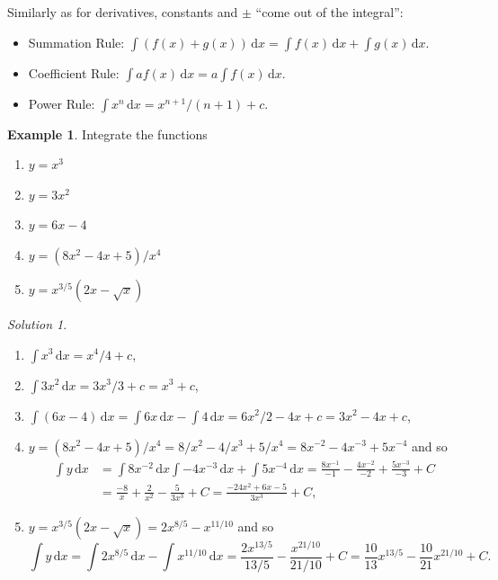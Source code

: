 \documentclass[
  english,
  11pt,
  oneside]{book}
\providecommand{\tightlist}{%
  \setlength{\itemsep}{0pt}\setlength{\parskip}{0pt}}
\newcommand{\slide}{}
\theoremstyle{definition}
\theoremstyle{definition}
\newtheorem{example}{Example}[chapter]
\theoremstyle{definition}
\theoremstyle{definition}
\theoremstyle{remark}
\newtheorem*{solution}{Solution}
\begin{document}
\slide

Similarly as for derivatives, constants and \(\pm\) ``come out of the integral'':

\begin{itemize}
\tightlist
\item
  Summation Rule: \(\displaystyle\int(f(x)+g(x))\,\mathrm{d}x = \displaystyle\int f(x)\,\mathrm{d}x + \displaystyle\int g(x)\,\mathrm{d}x\).
\item
  Coefficient Rule: \(\displaystyle\int af(x)\,\mathrm{d}x = a\displaystyle\int f(x)\,\mathrm{d}x\).
\item
  Power Rule: \(\displaystyle\int x^n \,\mathrm{d}x = x^{n+1}/(n+1) + c\).
\end{itemize}

\slide

\begin{example}

Integrate the functions

\begin{enumerate}
\def\labelenumi{\arabic{enumi}.}
\tightlist
\item
  \(y=x^3\)
\item
  \(y=3x^2\)
\item
  \(y=6x-4\)
\item
  \(y=(8x^2-4x+5)/x^4\)
\item
  \(y=x^{3/5}(2x-\sqrt{x})\)
\end{enumerate}

\end{example}

\begin{solution}
\leavevmode

\begin{enumerate}
\def\labelenumi{\arabic{enumi}.}
\tightlist
\item
  \(\displaystyle\int x^3 \,\mathrm{d}x = x^4/4+c\),
\item
  \(\displaystyle\int 3x^2 \,\mathrm{d}x = 3x^3/3+c = x^3+c\),
\item
  \(\displaystyle\int(6x-4)\,\mathrm{d}x = \displaystyle\int 6x \,\mathrm{d}x - \displaystyle\int 4\,\mathrm{d}x = 6x^2/2-4x+c = 3x^2-4x+c\),
\item
  \(y=(8x^2-4x+5)/x^4 = 8/x^2-4/x^3+5/x^4 = 8x^{-2}-4x^{-3}+5x^{-4}\) and so
  \begin{align*}
  \int y \,\mathrm{d}x& = \int 8x^{-2}\,\mathrm{d}x\int -4x^{-3}\,\mathrm{d}x+\int5x^{-4}\,\mathrm{d}x = \frac{8x^{-1}}{-1}-\frac{4x^{-2}}{-2}+\frac{5x^{-3}}{-3}+C\\
  &=\frac{-8}{x}+\frac{2}{x^2}-\frac{5}{3x^3} + C
  = \frac{-24x^2+6x-5}{3x^3} + C,
  \end{align*}
\item
  \(y = x^{3/5}(2x-\sqrt{x}) = 2x^{8/5}-x^{11/10}\) and so
  \[\int y \,\mathrm{d}x = \int 2x^{8/5}\,\mathrm{d}x-\int x^{11/10}\,\mathrm{d}x = \frac{2x^{13/5}}{13/5} - \frac{x^{21/10}}{21/10}+C = \frac{10}{13}x^{13/5}-\frac{10}{21}x^{21/10} + C.\]
\end{enumerate}

\end{solution}
\end{document}
